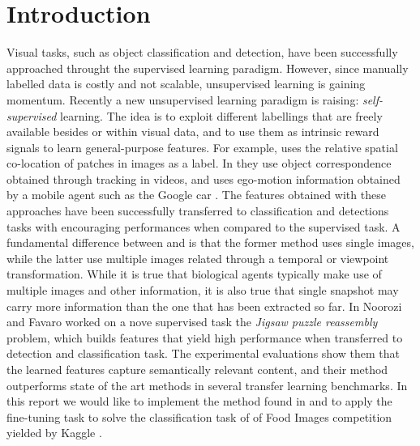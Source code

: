 \section{Introduction}
Visual tasks, such as object classification and detection, have been successfully approached throught the supervised learning paradigm. However, since manually labelled data is costly and not scalable, unsupervised learning is gaining momentum.\newline
Recently a new unsupervised learning paradigm is raising: \emph{self-supervised} learning. The idea is to exploit different labellings that are freely available besides or within visual data, and to use them as intrinsic reward signals to learn general-purpose features.
For example, \cite{context_prediction} uses the relative spatial co-location of patches in images as a label. In \cite{unsupervised_models_recognition} they use object correspondence obtained through tracking in videos, and \cite{learning_by_moving} uses ego-motion information obtained by a mobile agent such as the Google car \cite{landmark_identification}. The features obtained with these approaches have been successfully transferred to classification and detections tasks with encouraging performances when compared to the supervised task.\newline
A fundamental difference between \cite{context_prediction} and \cite{unsupervised_models_recognition} is that the former method uses single images, while the latter use multiple images related through a temporal or viewpoint transformation. While it is true that biological agents typically make use of multiple images and other information, it is also true that single snapshot may carry more information than the one that has been extracted so far. In \cite{Noroozi_2016} Noorozi and Favaro worked on a nove supervised task the \emph{Jigsaw puzzle reassembly} problem, which builds features that yield high performance when transferred to detection and classification task. The experimental evaluations show them that the learned features capture semantically relevant content, and their method outperforms state of the art methods in several transfer learning benchmarks.\newline
In this report we would like to implement the method found in \cite{Noroozi_2016} and to apply the fine-tuning task to solve the classification task of of Food Images \cite{food_images} competition yielded by Kaggle \cite{kaggle}. 



